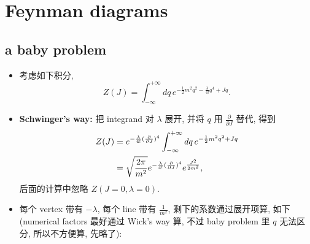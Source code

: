 \chapter{Feynman diagrams}
\section{a baby problem}
\begin{itemize}
	\item 考虑如下积分,
	\begin{equation} \label{3.1.1}
		Z(J) = \int_{- \infty}^{+ \infty} dq \, e^{- \frac{1}{2} m^2 q^2 - \frac{\lambda}{4!} q^4 + J q}.
	\end{equation}
	
	\item \textbf{Schwinger's way:} 把 integrand 对 $\lambda$ 展开, 并将 $q$ 用 $\frac{\partial}{\partial J}$ 替代, 得到
	\begin{align}
		Z(J) &= e^{- \frac{\lambda}{4!} (\frac{\partial}{\partial J})^4} \int_{- \infty}^{+ \infty} dq \, e^{- \frac{1}{2} m^2 q^2 + J q} \notag \\
		&= \sqrt{\frac{2 \pi}{m^2}} e^{- \frac{\lambda}{4!} (\frac{\partial}{\partial J})^4} e^{\frac{J^2}{2 m^2}}, \label{3.1.2}
	\end{align}
	后面的计算中忽略 $Z(J = 0, \lambda = 0)$.
	
	\item 每个 vertex 带有 $- \lambda$, 每个 line 带有 $\frac{1}{m^2}$, 剩下的系数通过展开项算, 如下 (numerical factors 最好通过 Wick's way 算, 不过 baby problem 里 $q$ 无法区分, 所以不方便算, 先略了):
	

\end{itemize}
